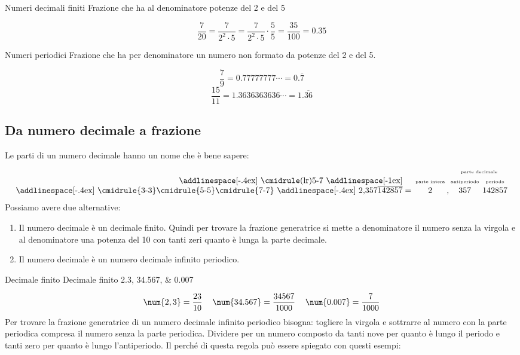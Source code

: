 \begin{esempiot}{Numeri decimali finiti}{}
	Frazione che ha al denominatore potenze del \num{2} e del \num{5}
\end{esempiot}
 \[\dfrac{7}{20}=\dfrac{7}{2^2\cdot 5}=\dfrac{7}{2^2\cdot 5}\cdot\dfrac{5}{5}=\dfrac{35}{100}=\num{0,35}\]
\begin{esempiot}{Numeri periodici}{}
Frazione che ha per denominatore un numero non formato da potenze del \num{2} e del \num{5}.
\end{esempiot}
\[\dfrac{7}{9}=\num{0.77777777}\cdots=0{.}\overline{7}\]\[\dfrac{15}{11}=\num{1,3636363636}\cdots=1{.}\overline{36}\]
\subsection{Da numero decimale a frazione}
Le parti di un numero decimale hanno un nome che è bene sapere:
\[\setlength{\tabcolsep}{1pt}
\begin{tabular}{r@{}cccccc}
&&&&\multicolumn{3}{c}{\tiny parte decimale}\\
\addlinespace[-.4ex]
\cmidrule(lr){5-7}
\addlinespace[-1ex]
&&\tiny parte intera&&\tiny antiperiodo&&\tiny periodo\\
\addlinespace[-.4ex]
\cmidrule{3-3}\cmidrule{5-5}\cmidrule{7-7}
\addlinespace[-.4ex]
$2{,}357\overline{142857}$&${}={}$&$2$&,&$357$&&$142857$
\end{tabular}
\]
Possiamo avere due alternative:
\begin{enumerate}
	\item Il numero decimale è un decimale finito. 
		Quindi per trovare la frazione generatrice si mette a denominatore il numero senza la virgola e al denominatore una potenza del \num{10} con tanti zeri quanto è lunga la parte decimale.
	\item Il numero decimale è un numero decimale infinito periodico. 
\end{enumerate}
\begin{esempiot}{Decimale finito}{}
	Decimale finito \numlist{2,3;34,567;0.007} 
\end{esempiot}
	\[\begin{tabular}{ccc}
	$\num{2,3}=\dfrac{23}{10}$&$\num{34.567}=\dfrac{34567}{1000}$&$\num{0.007}=\dfrac{7}{1000}$
	\end{tabular}\]
	Per trovare la frazione generatrice di un numero decimale infinito periodico bisogna: togliere la virgola e sottrarre al numero con la parte periodica compresa il numero senza la parte periodica. Dividere per un numero composto da tanti nove per quanto è lungo il periodo e tanti zero per quanto è lungo l'antiperiodo. Il perché di questa regola può essere spiegato con questi esempi:
